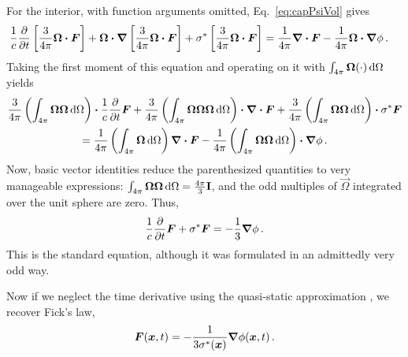 For the interior, with function arguments omitted, Eq.~\eqref{eq:capPsiVol} gives
\begin{align*}
  \frac{1}{c} \frac{\partial }{\partial t} \left[ \frac{3}{4\pi} \bm{\Omega} \bm{\cdot} \bm{F} \right]
  + \bm{\Omega}\bm{\cdot} \bm{\nabla} \left[ \frac{3}{4\pi} \bm{\Omega} \bm{\cdot} \bm{F} \right]
  + \sigma^\ast \left[ \frac{3}{4\pi} \bm{\Omega} \bm{\cdot} \bm{F} \right]
  &= \frac{1}{4\pi} \bm{\nabla} \bm{\cdot}\bm{F}
  - \frac{1}{4\pi} \bm{\Omega}\bm{\cdot} \bm{\nabla} \phi\,.
\end{align*}
Taking the first moment of this equation and operating on it with $\int_{4\pi}
\bm{\Omega}(\cdot) \mathop{}\!\mathrm{d}\Omega$ yields
\begin{multline*}
\frac{3}{4\pi} \left( \int_{4\pi} \bm{\Omega}\bm{\Omega}\mathop{}\!\mathrm{d}\Omega \right) \bm{\cdot}
\frac{1}{c} \frac{\partial }{\partial t} \bm{F}
+ \frac{3}{4\pi} \left( \int_{4\pi}
  \bm{\Omega}\bm{\Omega}\bm{\Omega}\mathop{}\!\mathrm{d}\Omega \right)
\bm{\cdot} \bm{\nabla} \bm{\cdot} \bm{F}
+ \frac{3}{4\pi} \left( \int_{4\pi} \bm{\Omega}\bm{\Omega}\mathop{}\!\mathrm{d}\Omega \right)
\bm{\cdot} \sigma^\ast \bm{F}
\\
= \frac{1}{4\pi} \left( \int_{4\pi} \bm{\Omega}\mathop{}\!\mathrm{d}\Omega \right)
\bm{\nabla} \bm{\cdot}\bm{F}
- \frac{1}{4\pi} \left( \int_{4\pi} \bm{\Omega}\bm{\Omega}\mathop{}\!\mathrm{d}\Omega \right)
\bm{\cdot} \bm{\nabla} \phi\,.
\end{multline*}
Now, basic vector identities \cite{Lar2007} reduce the parenthesized
quantities to very manageable expressions: $\int_{4\pi}
\bm{\Omega}\bm{\Omega}\mathop{}\!\mathrm{d}\Omega=\frac{4\pi}{3}\mathbf{I}$, and the odd
multiples of $\vec{\Omega}$ integrated over the unit sphere are zero. Thus,
\begin{equation*}
  \frac{1}{c} \frac{\partial }{\partial t} \bm{F}
  + \sigma^\ast \bm{F}
  =
  - \frac{1}{3} \bm{\nabla} \phi\,.
\end{equation*}
This is the standard \Pone{} equation, although it was formulated in an
admittedly very odd way.

Now if we neglect the time derivative using the quasi-static approximation
\cite{Dud1976}, we recover Fick's law,
\begin{equation*}
\bm{F}(\bm{x}, t) = -\frac{1}{3\sigma^\ast(\bm{x})} \bm{\nabla}\phi(\bm{x}, t) \,.
\end{equation*}

